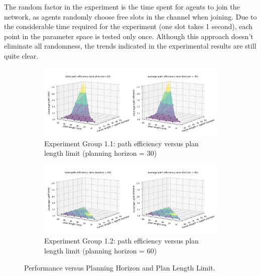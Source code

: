 The random factor in the experiment is the time spent for agents to join the network, as agents randomly choose free slots in the channel when joining.
Due to the considerable time required for the experiment (one slot takes 1 second), each point in the parameter space is tested only once.
Although this approach doesn't eliminate all randomness, the trends indicated in the experimental results are still quite clear.



\begin{figure}[htb]
    \centering
    \begin{subfigure}[t]{1.1\linewidth}
      \centering
      \includegraphics[width = \linewidth]{figures/horizon30_plan_length_limit_vs_performance.png}
      \caption{Experiment Group 1.1: path efficiency versus plan length limit (planning horizon = 30)}
      \label{fig:horizon=30,performance/planlengthlimit}
    \end{subfigure}
    \begin{subfigure}[t]{1.1\linewidth}
        \centering
        \includegraphics[width = \linewidth]{figures/horizon60_plan_length_limit_vs_performance.png}
        \caption{Experiment Group 1.2: path efficiency versus plan length limit (planning horizon = 60)}
        \label{fig:horizon=60,performance/planlengthlimit}
      \end{subfigure}
    \caption{Performance versus Planning Horizon and Plan Length Limit.}
    \label{fig:plan_length_limit}
\end{figure}

